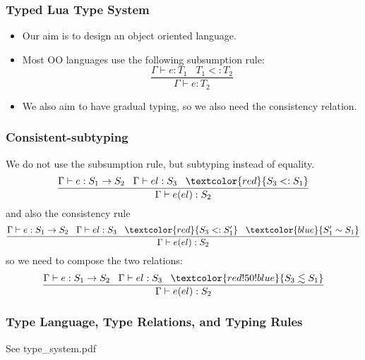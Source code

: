 \documentclass{beamer}
\newcommand{\subtype}{<:}
\newcommand{\env}{\Gamma}
\begin{document}
\begin{frame}
\frametitle{Typed Lua Type System}
\begin{itemize}
\item Our aim is to design an object oriented language.
\item Most OO languages use the following subsumption rule:
\[
\frac{\env \vdash e:T_{1} \;\;\; T_{1} \subtype T_{2}}
     {\env \vdash e:T_{2}}
\]
\item We also aim to have gradual typing, so we also
need the consistency relation.
\end{itemize}
\end{frame}

\begin{frame}
\frametitle{Consistent-subtyping}
We do not use the subsumption rule, but subtyping
instead of equality.
\[
\frac{\env \vdash e:S_{1} \rightarrow S_{2} \;\;\;
      \env \vdash el:S_{3} \;\;\;
      \textcolor{red}{S_{3} \subtype S_{1}}}
     {\env \vdash e(el):S_{2}}
\]
and also the consistency rule
\[
\frac{\env \vdash e:S_{1} \rightarrow S_{2} \;\;\;
      \env \vdash el:S_{3} \;\;\;
      \textcolor{red}{S_{3} \subtype S_{1}'} \;\;\;
      \textcolor{blue}{S_{1}' \sim S_{1}}}
     {\env \vdash e(el):S_{2}}
\]
so we need to compose the two relations:
\[
\frac{\env \vdash e:S_{1} \rightarrow S_{2} \;\;\;
      \env \vdash el:S_{3} \;\;\;
      \textcolor{red!50!blue}{S_{3} \lesssim S_{1}}}
     {\env \vdash e(el):S_{2}}
\]
\end{frame}

\begin{frame}
\frametitle{Type Language, Type Relations, and Typing Rules}
See type\_system.pdf
\end{frame}
\end{document}
